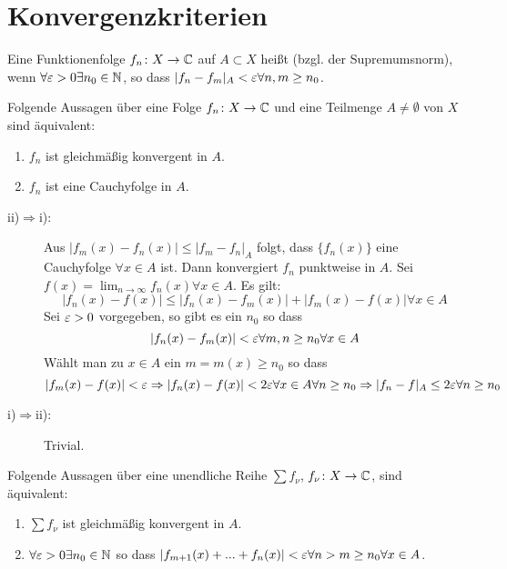 \section{Konvergenzkriterien}
\begin{definition}
	Eine Funktionenfolge $ f_n\colon X\rightarrow\mathbb{C} $ auf $ A\subset X $ hei\ss t  (bzgl. der Supremumsnorm), wenn $ \forall\varepsilon>0\exists n_0\in\mathbb{N} $, so dass $ |f_n-f_m|_A<\varepsilon\forall n,m\geq n_0 $.
\end{definition}
\begin{satz}
	Folgende Aussagen \"uber eine Folge $ f_n\colon X\rightarrow\mathbb{C} $ und eine Teilmenge $ A\neq\emptyset $ von $ X $ sind \"aquivalent:
	\begin{enumerate}
		\item $ f_n $ ist gleichm\"a\ss ig konvergent in $ A $.
		\item $ f_n $ ist eine Cauchyfolge in $ A $.
	\end{enumerate}
\end{satz}
\begin{beweis}
	\begin{description}
		\item[ii)$ \Rightarrow $i):] Aus $ |f_m(x)-f_n(x)|\leq|f_m-f_n|_A $ folgt, dass $ \lbrace f_n(x)\rbrace $ eine Cauchyfolge $ \forall x\in A $ ist. Dann konvergiert $ f_n $ punktweise in $ A $. Sei $ f(x)=\lim_{n\to\infty}f_n(x)\forall x\in A $. Es gilt:
		\[ |f_n(x)-f(x)|\leq|f_n(x)-f_m(x)|+|f_m(x)-f(x)|\forall x\in A \]
		Sei $ \varepsilon>0 $ vorgegeben, so gibt es ein $ n_0 $ so dass
		\[ |f_n(x)-f_m(x)|<\varepsilon\forall m,n\geq n_0\forall x\in A \]
		W\"ahlt man zu $ x\in A $ ein $ m=m(x)\geq n_0 $ so dass
		\[ |f_m(x)-f(x)|<\varepsilon\Rightarrow |f_n(x)-f(x)|<2\varepsilon\forall x\in A\forall n\geq n_0\Rightarrow |f_n-f|_A\leq 2\varepsilon\forall n\geq n_0 \]
		\item[i)$ \Rightarrow $ii):] Trivial.
	\end{description}
\end{beweis}
\begin{satz}
	Folgende Aussagen \"uber eine unendliche Reihe $ \sum f_\nu $, $ f_\nu\colon X\rightarrow\mathbb{C} $, sind \"aquivalent:
	\begin{enumerate}
		\item $ \sum f_\nu $ ist gleichm\"a\ss ig konvergent in $ A $.
		\item $ \forall\varepsilon>0\exists n_0\in\mathbb{N} $ so dass $ |f_{m+1}(x)+...+f_n(x)|<\varepsilon\forall n>m\geq n_0\forall x\in A $.
	\end{enumerate}
\end{satz}
